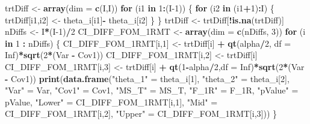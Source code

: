 \documentclass[
]{book}
\newenvironment{Shaded}{\begin{snugshade}}{\end{snugshade}}
\newcommand{\ControlFlowTok}[1]{\textcolor[rgb]{0.13,0.29,0.53}{\textbf{#1}}}
\newcommand{\DataTypeTok}[1]{\textcolor[rgb]{0.13,0.29,0.53}{#1}}
\newcommand{\DecValTok}[1]{\textcolor[rgb]{0.00,0.00,0.81}{#1}}
\newcommand{\KeywordTok}[1]{\textcolor[rgb]{0.13,0.29,0.53}{\textbf{#1}}}
\newcommand{\NormalTok}[1]{#1}
\newcommand{\OperatorTok}[1]{\textcolor[rgb]{0.81,0.36,0.00}{\textbf{#1}}}
\newcommand{\OtherTok}[1]{\textcolor[rgb]{0.56,0.35,0.01}{#1}}
\newcommand{\StringTok}[1]{\textcolor[rgb]{0.31,0.60,0.02}{#1}}
\begin{document}
\begin{Shaded}
\begin{Highlighting}[]
\NormalTok{trtDiff <-}\StringTok{ }\KeywordTok{array}\NormalTok{(}\DataTypeTok{dim =} \KeywordTok{c}\NormalTok{(I,I))}
\ControlFlowTok{for}\NormalTok{ (i1 }\ControlFlowTok{in} \DecValTok{1}\OperatorTok{:}\NormalTok{(I}\DecValTok{-1}\NormalTok{)) \{    }
  \ControlFlowTok{for}\NormalTok{ (i2 }\ControlFlowTok{in}\NormalTok{ (i1}\OperatorTok{+}\DecValTok{1}\NormalTok{)}\OperatorTok{:}\NormalTok{I) \{}
\NormalTok{    trtDiff[i1,i2] <-}\StringTok{ }\NormalTok{theta_i[i1]}\OperatorTok{-}\StringTok{ }\NormalTok{theta_i[i2]    }
\NormalTok{  \}}
\NormalTok{\}}
\NormalTok{trtDiff <-}\StringTok{ }\NormalTok{trtDiff[}\OperatorTok{!}\KeywordTok{is.na}\NormalTok{(trtDiff)]}
\NormalTok{nDiffs <-}\StringTok{ }\NormalTok{I}\OperatorTok{*}\NormalTok{(I}\DecValTok{-1}\NormalTok{)}\OperatorTok{/}\DecValTok{2}
\NormalTok{CI_DIFF_FOM_1RMT <-}\StringTok{ }\KeywordTok{array}\NormalTok{(}\DataTypeTok{dim =} \KeywordTok{c}\NormalTok{(nDiffs, }\DecValTok{3}\NormalTok{))}
\ControlFlowTok{for}\NormalTok{ (i }\ControlFlowTok{in} \DecValTok{1} \OperatorTok{:}\StringTok{ }\NormalTok{nDiffs) \{}
\NormalTok{  CI_DIFF_FOM_1RMT[i,}\DecValTok{1}\NormalTok{] <-}\StringTok{ }\NormalTok{trtDiff[i] }\OperatorTok{+}\StringTok{ }\KeywordTok{qt}\NormalTok{(alpha}\OperatorTok{/}\DecValTok{2}\NormalTok{,  }\DataTypeTok{df =} \OtherTok{Inf}\NormalTok{)}\OperatorTok{*}\KeywordTok{sqrt}\NormalTok{(}\DecValTok{2}\OperatorTok{*}\NormalTok{(Var }\OperatorTok{-}\StringTok{ }\NormalTok{Cov1))}
\NormalTok{  CI_DIFF_FOM_1RMT[i,}\DecValTok{2}\NormalTok{] <-}\StringTok{ }\NormalTok{trtDiff[i]}
\NormalTok{  CI_DIFF_FOM_1RMT[i,}\DecValTok{3}\NormalTok{] <-}\StringTok{ }\NormalTok{trtDiff[i] }\OperatorTok{+}\StringTok{ }\KeywordTok{qt}\NormalTok{(}\DecValTok{1}\OperatorTok{-}\NormalTok{alpha}\OperatorTok{/}\DecValTok{2}\NormalTok{,}\DataTypeTok{df =} \OtherTok{Inf}\NormalTok{)}\OperatorTok{*}\KeywordTok{sqrt}\NormalTok{(}\DecValTok{2}\OperatorTok{*}\NormalTok{(Var }\OperatorTok{-}\StringTok{ }\NormalTok{Cov1))}
  \KeywordTok{print}\NormalTok{(}\KeywordTok{data.frame}\NormalTok{(}\StringTok{"theta_1"}\NormalTok{ =}\StringTok{ }\NormalTok{theta_i[}\DecValTok{1}\NormalTok{],}
                   \StringTok{"theta_2"}\NormalTok{ =}\StringTok{ }\NormalTok{theta_i[}\DecValTok{2}\NormalTok{],}
                   \StringTok{"Var"}\NormalTok{ =}\StringTok{ }\NormalTok{Var,}
                   \StringTok{"Cov1"}\NormalTok{ =}\StringTok{ }\NormalTok{Cov1,}
                   \StringTok{"MS_T"}\NormalTok{ =}\StringTok{ }\NormalTok{MS_T,}
                   \StringTok{"F_1R"}\NormalTok{ =}\StringTok{ }\NormalTok{F_1R, }
                   \StringTok{"pValue"}\NormalTok{ =}\StringTok{ }\NormalTok{pValue,}
                   \StringTok{"Lower"}\NormalTok{ =}\StringTok{ }\NormalTok{CI_DIFF_FOM_1RMT[i,}\DecValTok{1}\NormalTok{], }
                   \StringTok{"Mid"}\NormalTok{ =}\StringTok{ }\NormalTok{CI_DIFF_FOM_1RMT[i,}\DecValTok{2}\NormalTok{], }
                   \StringTok{"Upper"}\NormalTok{ =}\StringTok{ }\NormalTok{CI_DIFF_FOM_1RMT[i,}\DecValTok{3}\NormalTok{]))}
\NormalTok{\}}
\end{Highlighting}
\end{Shaded}
\end{document}
